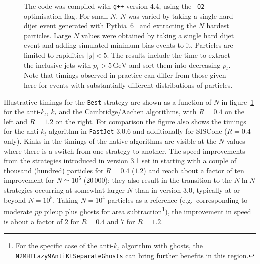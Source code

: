 \documentclass[12pt,a4]{article}
\newcommand{\fastjet}{\texttt{FastJet}\xspace}
\newcommand{\ttt}[1]{{\small\texttt{#1}}}
\newcommand{\GeV}{\,\text{GeV}}
\begin{document}
\begin{figure}[tp]
{    %
    The code was compiled with \ttt{g++} version 4.4, using the \ttt{-O2}
    optimisation flag.
    For small $N$, $N$ was varied by taking a single hard dijet event
    generated with Pythia~6~\cite{Sjostrand:2006za} and extracting the
    $N$ hardest particles. 
    Large $N$ values were obtained by taking a single hard dijet event
    and adding simulated minimum-bias events to it.  
    Particles are limited to rapidities $|y|<5$.
    The results include the time to extract the inclusive jets with
    $p_t > 5\GeV$ and sort them into decreasing $p_t$.
    Note that timings observed in practice can differ from those given
    here for events with substantially different distributions of
    particles.  
  }
  \label{fig:timings}
\end{figure}

Illustrative timings for the \ttt{Best} strategy are shown as a
function of $N$ in figure~\ref{fig:timings} for the anti-$k_t$, $k_t$
and the Cambridge/Aachen algorithms, with $R=0.4$ on the left and
$R=1.2$ on the right.
%
For comparison the figure also shows the timings for the anti-$k_t$
algorithm in \fastjet 3.0.6 and additionally for SISCone ($R=0.4$ only).
%
Kinks in the timings of the native algorithms are visible at the $N$
values where there is a switch from one strategy to another.
%
%
%
The speed improvements from the strategies introduced in version
3.1 set in starting with a couple of thousand (hundred) particles for
$R=0.4$ ($1.2$) and reach about a factor of ten improvement for
$N\simeq 10^5$ ($20\,000$); they also result in the transition to the
$N\ln N$ strategies occurring at somewhat larger $N$ than in version
3.0, typically at or beyond $N=10^5$.
%
%
Taking $N=10^4$ particles as a reference (e.g.\ corresponding to moderate
$pp$ pileup plus ghosts for area subtraction\footnote{For the specific
  case of the anti-$k_t$ algorithm with ghosts, the
  \ttt{N2MHTLazy9AntiKtSeparateGhosts} can bring further benefits in
  this region.}), the improvement in speed is about a factor of $2$
for $R=0.4$ and $7$ for $R=1.2$.
\end{document}
